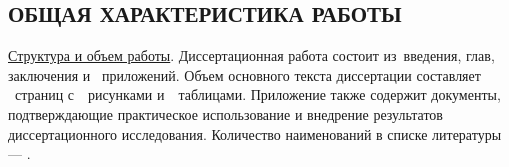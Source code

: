 

\setcounter{page}{3}

\subsection*{\MakeUppercase{Общая характеристика работы}}



\underline{Структура и объем работы}. Диссертационная работа состоит
из~введения,  глав, заключения и~ приложений. Объем
основного текста диссертации составляет ~страниц
с~~рисунками и~~таблицами. Приложение также содержит
документы, подтверждающие практическое использование и внедрение
результатов диссертационного исследования. Количество наименований в
списке литературы --- .
